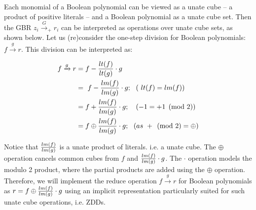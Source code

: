 Each monomial of a Boolean polynomial can be viewed as a unate cube --
a product of positive literals -- and a Boolean polynomial as a unate
cube set. Then the GBR $z_i\xrightarrow{G}_+ r_i$ can be interpreted
as %
operations over unate cube sets, 
as shown below. Let us (re)consider the one-step
division for Boolean polynomials: $f\xrightarrow{g} r$. This division
can be interpreted as:



 \begin{align}
\label{eqns:reduce}
f \xrightarrow{g} r & = f - {{lt(f)} \over {lt(g)}} \cdot g \\
& = ~ f - {{lm(f)} \over {lm(g)}} \cdot g; ~~( ~lt(f)=lm(f))\\ 
& = f + {{lm(f)} \over {lm(g)}} \cdot g; ~~~(-1 = +1 \pmod{ 2})\\
& = f \oplus {{lm(f)} \over {lm(g)}} \cdot g; ~~( as ~+ \pmod{2} =
\oplus) \label{eqns:reduce1}
\end{align}






Notice that ${{lm(f)} \over {lm(g)}}$ is a unate product of 
literals. i.e. a unate cube. The $\oplus$ operation cancels common
cubes from $f$ and ${{lm(f)} \over {lm(g)}}\cdot g$. The $\cdot$
operation models the modulo 2 product, where the partial products are
added using the $\oplus$  operation. Therefore, we
will implement the reduce operation $f\xrightarrow{g} r$ for Boolean
polynomials as $r = f \oplus {{lm(f)} \over {lm(g)}} \cdot g$ using
an implicit representation particularly suited for such unate cube
operations, i.e. ZDDs.  

